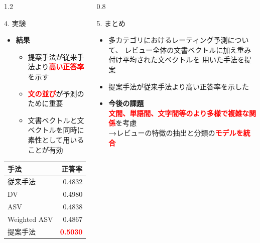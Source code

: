\documentclass[unicode,10pt]{beamer}
\newlength{\mycolumnwidth}
\newcommand{\arrow}{\textcolor{ttiblue}{\textbf{→}}\hspace{1ex}}
\newcommand{\itemtitle}[1]{\textbf{#1}\\}
\newcommand{\fire}[1]{\textcolor{red}{\textbf{#1}}}
\newcommand{\doublecolumns}[4]{
    \begin{minipage}[t]{#1}
      #2
    \end{minipage}
    \begin{minipage}[t]{#3}
      #4
    \end{minipage}}
\begin{document}
\begin{frame}
\begin{columns}[onlytextwidth,t]
\begin{column}{1.2\mycolumnwidth}
\begin{block}{4. 実験}
      \doublecolumns{0.6\textwidth}{
        \begin{itemize}
          \item \itemtitle{結果}
            \begin{itemize}
              \item 提案手法が従来手法より\fire{高い正答率}を示す
              \item \fire{文の並び}が予測のために重要
              \item 文書ベクトルと文ベクトルを同時に素性として用いることが有効
            \end{itemize}
        \end{itemize}
      }{0.375\textwidth}{
        \begin{table}
          \centering
          \begin{tabular}{l | r}
            手法 & 正答率 \\
            \hline
            従来手法\cite{fujitani15} & 0.4832 \\
            DV & 0.4980 \\
            ASV & 0.4838 \\
            Weighted ASV & 0.4867 \\
            提案手法 & \fire{0.5030} \\
          \end{tabular}
        \end{table}
      }
    \end{block}
  \end{column}

  \begin{column}{0.8\mycolumnwidth}
    \begin{block}{5. まとめ}
      \begin{itemize}
        \item 多カテゴリにおけるレーティング予測について、
              レビュー全体の文書ベクトルに加え重み付け平均された文ベクトルを
              用いた手法を提案
        \item 提案手法が従来手法\cite{fujitani15}より高い正答率を示した
        \item \itemtitle{今後の課題}
              \fire{文間、単語間、文字間等のより多様で複雑な関係}を考慮 \\
              \arrow レビューの特徴の抽出と分類の\fire{モデルを統合}
      \end{itemize}
    \end{block}


\end{column}
\end{columns}
\end{frame}
\end{document}
